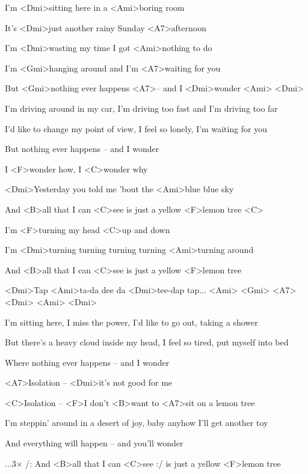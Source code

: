 

\zs
I'm <Dmi>sitting here in a <Ami>boring room

It's <Dmi>just another rainy Sunday <A7>afternoon

I'm <Dmi>wasting my time I got <Ami>nothing to do

I'm <Gmi>hanging around and I'm <A7>waiting for you

But <Gmi>nothing ever happens <A7>-- and I <Dmi>wonder <Ami> <Dmi>
\ks

\zs
I'm driving around in my car, I'm driving too fast and I'm driving too far

I'd like to change my point of view, I feel so lonely, I'm waiting for you

But nothing ever happens -- and I wonder
\ks

\zr
I <F>wonder how, I <C>wonder why

<Dmi>Yesterday you told me 'bout the <Ami>blue blue sky

And <B>all that I can <C>see is just a yellow <F>lemon tree <C>

I'm <F>turning my head <C>up and down

I'm <Dmi>turning turning turning turning <Ami>turning around

And <B>all that I can <C>see is just a yellow <F>lemon tree
\kr

\zs
<Dmi>Tap <Ami>ta-da dee da <Dmi>tee-dap tap... <Ami> <Gmi>
<A7> <Dmi> <Ami> <Dmi>
\ks

\zs
I'm sitting here, I miss the power, I'd like to go out, taking a shower

But there's a heavy cloud inside my head, I feel so tired, put myself into bed

Where nothing ever happens -- and I wonder
\ks

<A7>Isolation -- <Dmi>it's not good for me

<C>Isolation -- <F>I don't <B>want to <A7>sit on a lemon tree

\zs
I'm steppin' around in a desert of joy, baby anyhow I'll get another toy

And everything will happen -- and you'll wonder
\ks

\zr\kr

...3× /: And <B>all that I can <C>see :/
is just a yellow <F>lemon tree

\kp
